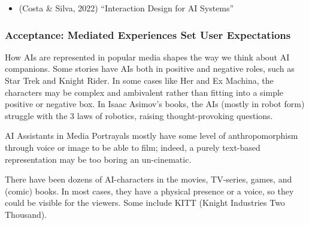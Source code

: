 \documentclass[
  letterpaper,
  DIV=11,
  numbers=noendperiod]{scrartcl}
\providecommand{\tightlist}{%
  \setlength{\itemsep}{0pt}\setlength{\parskip}{0pt}}\usepackage{longtable,booktabs,array}
\begin{document}
\begin{itemize}
\tightlist
\item
  (Costa \& Silva, 2022) ``Interaction Design for AI Systems''
\end{itemize}

\subsubsection{Acceptance: Mediated Experiences Set User
Expectations}\label{acceptance-mediated-experiences-set-user-expectations}

How AIs are represented in popular media shapes the way we think about
AI companions. Some stories have AIs both in positive and negative
roles, such as Star Trek and Knight Rider. In some cases like Her and Ex
Machina, the characters may be complex and ambivalent rather than
fitting into a simple positive or negative box. In Isaac Asimov's books,
the AIs (mostly in robot form) struggle with the 3 laws of robotics,
raising thought-provoking questions.

AI Assistants in Media Portrayals mostly have some level of
anthropomorphism through voice or image to be able to film; indeed, a
purely text-based representation may be too boring an un-cinematic.

There have been dozens of AI-characters in the movies, TV-series, games,
and (comic) books. In most cases, they have a physical presence or a
voice, so they could be visible for the viewers. Some include KITT
(Knight Industries Two Thousand).
\end{document}
